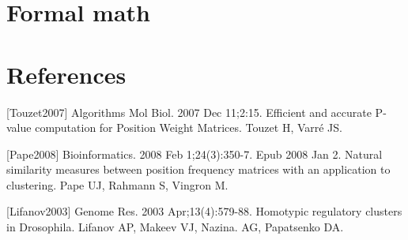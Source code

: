 \documentclass[draft]{article}
\newcommand*{\pvalue}{\mbox{P-value}}
\begin{document}










\section{Formal math}
  
  

\section*{References}
[Touzet2007] Algorithms Mol Biol. 2007 Dec 11;2:15. Efficient and accurate \pvalue  
computation for Position Weight Matrices. Touzet H, Varré JS.

[Pape2008] Bioinformatics. 2008 Feb 1;24(3):350-7. Epub 2008 Jan 2. Natural similarity 
measures between position frequency matrices with an application to clustering. Pape UJ, 
Rahmann S, Vingron M.

[Lifanov2003] Genome Res. 2003 Apr;13(4):579-88. Homotypic regulatory clusters in 
Drosophila. Lifanov AP, Makeev VJ, Nazina. AG, Papatsenko DA.
\end{document}
